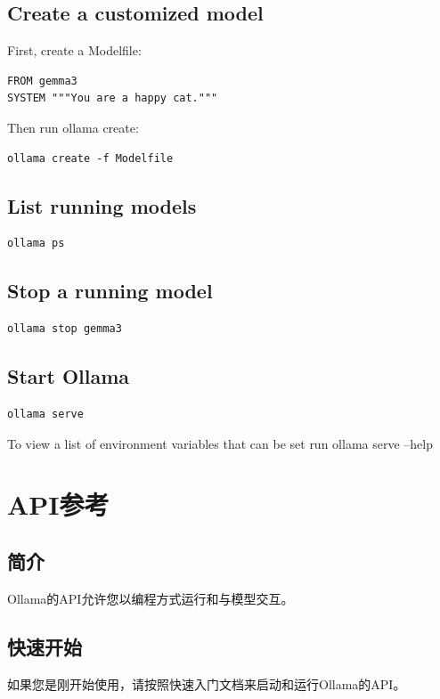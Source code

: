 \documentclass[12pt,UTF8]{ctexbook}
\begin{document}
\subsection{Create a customized model}
First, create a Modelfile:
\begin{verbatim}
FROM gemma3
SYSTEM """You are a happy cat."""
\end{verbatim}

Then run ollama create:
\begin{verbatim}
ollama create -f Modelfile
\end{verbatim}

\subsection{List running models}
\begin{verbatim}
ollama ps
\end{verbatim}

\subsection{Stop a running model}
\begin{verbatim}
ollama stop gemma3
\end{verbatim}

\subsection{Start Ollama}
\begin{verbatim}
ollama serve
\end{verbatim}

To view a list of environment variables that can be set run ollama serve --help

\section{API参考}

\subsection{简介}

Ollama的API允许您以编程方式运行和与模型交互。

\subsection{快速开始}

如果您是刚开始使用，请按照快速入门文档来启动和运行Ollama的API。
\end{document}
